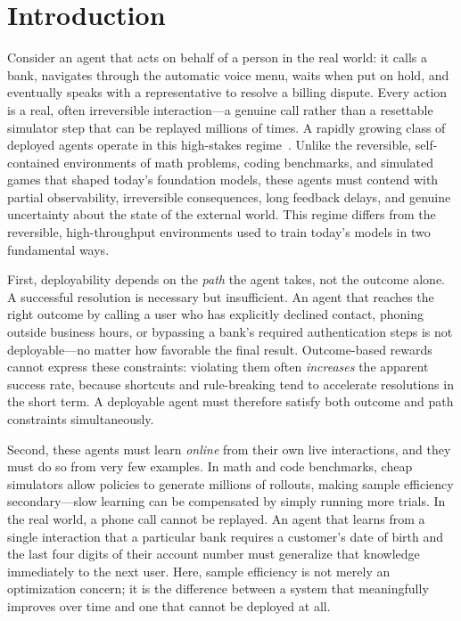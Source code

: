 \section{Introduction}

Consider an agent that acts on behalf of a person in the real world: it calls a bank, navigates through the automatic voice menu, waits when put on hold, and eventually speaks with a representative to resolve a billing dispute. Every action is a real, often irreversible interaction---a genuine call rather than a resettable simulator step that can be replayed millions of times. A rapidly growing class of deployed agents operate in this high-stakes regime~\citep{pineai}. Unlike the reversible, self-contained environments of math problems, coding benchmarks, and simulated games that shaped today's foundation models, these agents must contend with partial observability, irreversible consequences, long feedback delays, and genuine uncertainty about the state of the external world. This regime differs from the reversible, high-throughput environments used to train today's models in two fundamental ways.

First, deployability depends on the \emph{path} the agent takes, not the outcome alone. A successful resolution is necessary but insufficient. An agent that reaches the right outcome by calling a user who has explicitly declined contact, phoning outside business hours, or bypassing a bank's required authentication steps is not deployable---no matter how favorable the final result. Outcome-based rewards cannot express these constraints: violating them often \emph{increases} the apparent success rate, because shortcuts and rule-breaking tend to accelerate resolutions in the short term. A deployable agent must therefore satisfy both outcome and path constraints simultaneously.

Second, these agents must learn \emph{online} from their own live interactions, and they must do so from very few examples. In math and code benchmarks, cheap simulators allow policies to generate millions of rollouts, making sample efficiency secondary---slow learning can be compensated by simply running more trials. In the real world, a phone call cannot be replayed. An agent that learns from a single interaction that a particular bank requires a customer's date of birth and the last four digits of their account number must generalize that knowledge immediately to the next user. Here, sample efficiency is not merely an optimization concern; it is the difference between a system that meaningfully improves over time and one that cannot be deployed at all.

